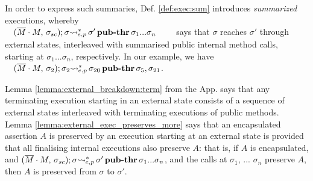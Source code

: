 \noindent 
In order to express such summaries, Def. \ref{def:exec:sum} introduces \emph{summarized} executions, whereby\\ 
$\strut \ \ \  (\overline{M}\cdot M,\, {\sigma_{sc}}); \sigma {{\rightsquigarrow^*}} \!\!\!_{e,p}\, \sigma'\, {\textbf{pub-thr}}\, {\sigma_1...\sigma_n}$  \ \  \  \ says that $\sigma$ reaches $\sigma'$ through 
external states, interleaved with summarised public internal method calls, starting at ${\sigma_1...\sigma_n}$, respectively.
%
In our example, we have 
 $\strut \ \ \  (\overline{M}\cdot M,\, {\sigma_2}); \sigma_{2} {{\rightsquigarrow^*}} \!\!\!_{e,p}\, \sigma_{20}\, {\textbf{pub-thr}}\, {\sigma_5,\sigma_{21}}$.


\vspace{.1cm}

Lemma \ref{lemma:external_breakdown:term} from  the  App.   says that any terminating execution
 starting in an external state  consists of a  sequence of  external states interleaved with terminating executions
of public methods.
Lemma  \ref{lemma:external_exec_preserves_more} says that an encapsulated assertion $A$  is preserved by an execution
starting at an external state is provided that all finalising internal executions  %
also preserve $A$: that is, if $A$ is encapsulated, 
 and $(\overline{M}\cdot M,\, {\sigma_{sc}}); \sigma {{\rightsquigarrow^*}} \!\!\!_{e,p}\, \sigma'\, {\textbf{pub-thr}}\, {\sigma_1...\sigma_n}$, and 
 the calls at  $\sigma_1$, ... $\sigma_n$ preserve $A$,  then $A$ is preserved from $\sigma$ to $\sigma'$.  
% 
  


